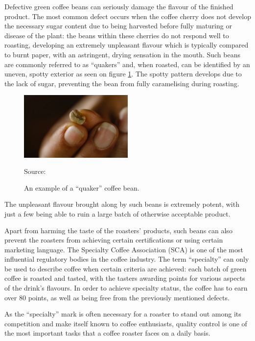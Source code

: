 Defective green coffee beans can seriously damage the flavour of the finished
product. The most common defect occurs when the coffee cherry does not develop the
necessary sugar content due to being harvested before fully maturing or disease of
the plant: the beans within these cherries do not respond well to roasting, developing
an extremely unpleasant flavour which is typically compared to burnt paper, with
an astringent, drying sensation in the mouth. Such beans are commonly referred
to as ``quakers'' and, when roasted, can be identified by an uneven, spotty exterior
as seen on figure \ref{fig:quakerBeanExample}. The spotty pattern develops due
to the lack of sugar, preventing the bean from fully caramelising during roasting.
\begin{figure}
	\includegraphics[width=0.5\textwidth]{figures/introduction/quaker-coffee-bean}
	\caption{*}
	{Source: \cite{quakerBeanImg}}
	\caption{An example of a ``quaker'' coffee bean.}
	\label{fig:quakerBeanExample}
\end{figure}
The unpleasant flavour brought along by such beans is extremely potent, with just
a few being able to ruin a large batch of otherwise acceptable product.

Apart from harming the taste of the roasters' products, such beans can also prevent
the roasters from achieving certain certifications or using certain marketing language.
The Specialty Coffee Association (SCA) is one of the most influential regulatory
bodies in the coffee industry. The term ``specialty'' can only be used to describe
coffee when certain criteria are achieved: each batch of green coffee is roasted
and tasted, with the tasters awarding points for various aspects of the drink's flavours.
In order to achieve specialty status, the coffee has to earn over 80 points, as
well as being free from the previously mentioned defects.

As the ``specialty'' mark is often necessary for a roaster to stand out among
its competition and make itself known to coffee enthusiasts, quality control is one
of the most important tasks that a coffee roaster faces on a daily basis.

